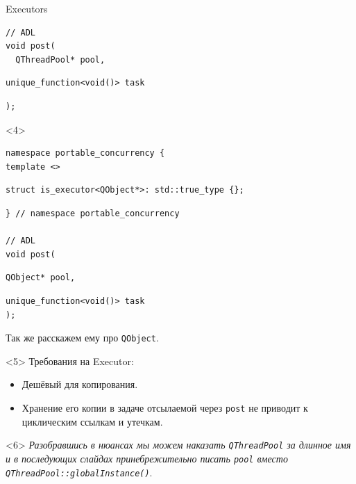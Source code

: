 \documentclass[aspectratio=169,hyperref={unicode},17pt]{beamer}
\begin{document}
\begin{frame}[fragile,t]{Executors}
\begin{onlyenv}
\begin{lstlisting}[style=cppcode,aboveskip=0pt,belowskip=0pt]
// ADL
void post(
  QThreadPool* pool,
\end{lstlisting}
\begin{lstlisting}[style=cppcode,backgroundcolor=\color{gray!30},aboveskip=0pt,belowskip=0pt]
  unique_function<void()> task
\end{lstlisting}
\begin{lstlisting}[style=cppcode,aboveskip=0pt,belowskip=0pt]
);
\end{lstlisting}
\end{onlyenv}
\begin{onlyenv}<4>
\begin{lstlisting}[style=cppcode,aboveskip=0pt,belowskip=0pt]
namespace portable_concurrency {
template <>
\end{lstlisting}
\begin{lstlisting}[style=cppcode,backgroundcolor=\color{gray!30},aboveskip=0pt,belowskip=0pt]
struct is_executor<QObject*>: std::true_type {};
\end{lstlisting}
\begin{lstlisting}[style=cppcode,aboveskip=0pt,belowskip=0pt]
} // namespace portable_concurrency

// ADL
void post(
\end{lstlisting}
\begin{lstlisting}[style=cppcode,backgroundcolor=\color{gray!30},aboveskip=0pt,belowskip=0pt]
  QObject* pool,
\end{lstlisting}
\begin{lstlisting}[style=cppcode,aboveskip=0pt,belowskip=0pt]
  unique_function<void()> task
);
\end{lstlisting}
Так же расскажем ему про \texttt{QObject}.
\end{onlyenv}
\begin{onlyenv}<5>
Требования на Executor:
\begin{itemize}
 \item Дешёвый для копирования.
 \item Хранение его копии в задаче отсылаемой через \texttt{post} не приводит к циклическим ссылкам и утечкам.
\end{itemize}
\end{onlyenv}
\begin{onlyenv}<6>
\textit{\footnotesize{Разобравшись в нюансах мы можем наказать \texttt{QThreadPool} за длинное имя и в последующих слайдах принебрежительно писать \texttt{pool} вместо \texttt{QThreadPool::globalInstance()}}}.
\end{onlyenv}
\end{frame}
\end{document}
